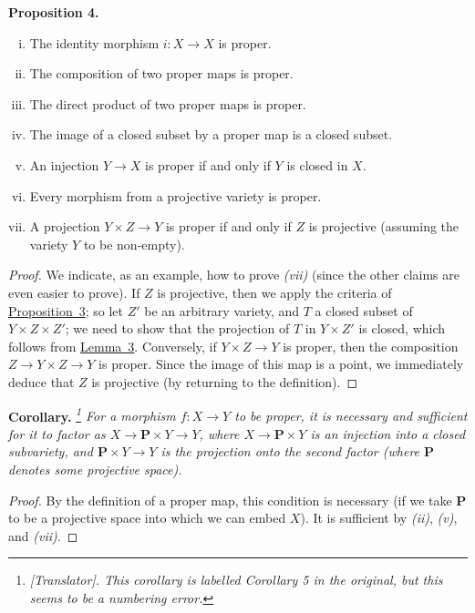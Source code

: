 \documentclass{article}
\newenvironment{itenv}[1]
  {\phantomsection\par\medskip\noindent\textbf{#1.}\itshape}
  {\par\medskip}
\newcommand{\PP}{\mathbf{P}}
\begin{document}
\begin{itenv}{Proposition 4}
\label{proposition4}
  \begin{enumerate}[(i)]
    \item The identity morphism $i\colon X\to X$ is proper.
    \item The composition of two proper maps is proper.
    \item The direct product of two proper maps is proper.
    \item The image of a closed subset by a proper map is a closed subset.
    \item An injection $Y\to X$ is proper if and only if $Y$ is closed in $X$.
    \item Every morphism from a projective variety is proper.
    \item A projection $Y\times Z\to Y$ is proper if and only if $Z$ is projective (assuming the variety $Y$ to be non-empty).
  \end{enumerate}
\end{itenv}

\begin{proof}
  We indicate, as an example, how to prove \emph{(vii)} (since the other claims are even easier to prove).
  If $Z$ is projective, then we apply the criteria of \hyperref[proposition3]{Proposition~3};
  so let $Z'$ be an arbitrary variety, and $T$ a closed subset of $Y\times Z\times Z'$;
  we need to show that the projection of $T$ in $Y\times Z'$ is closed, which follows from \hyperref[lemma3]{Lemma~3}.
  Conversely, if $Y\times Z\to Y$ is proper, then the composition $Z\to Y\times Z\to Y$ is proper.
  Since the image of this map is a point, we immediately deduce that $Z$ is projective (by returning to the definition).
\end{proof}

\begin{itenv}{Corollary}
\label{corollary5}
  \footnote{\emph{[Translator]. This corollary is labelled \emph{Corollary 5} in the original, but this seems to be a numbering error.}}
  For a morphism $f\colon X\to Y$ to be proper, it is necessary and sufficient for it to factor as $X\to \PP\times Y\to Y$, where $X\to \PP\times Y$ is an injection into a closed subvariety, and $\PP\times Y\to Y$ is the projection onto the second factor (where $\PP$ denotes some projective space).
\end{itenv}

\begin{proof}
  By the definition of a proper map, this condition is necessary (if we take $\PP$ to be a projective space into which we can embed $X$).
  It is sufficient by \emph{(ii)}, \emph{(v)}, and \emph{(vii)}.
\end{proof}
\end{document}
